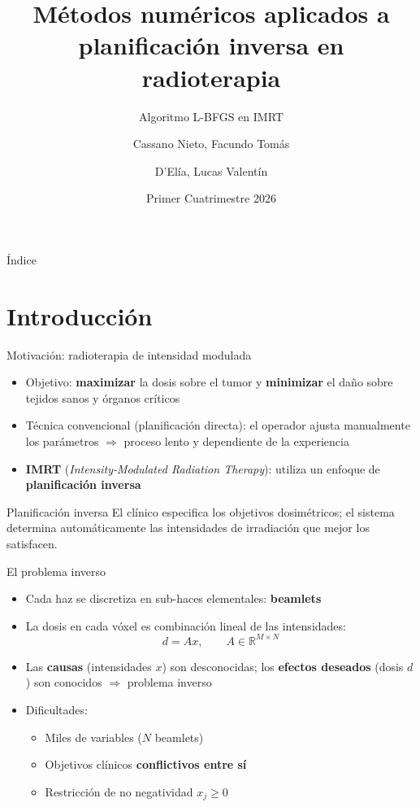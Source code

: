 \documentclass[11pt]{beamer}
\title[L-BFGS en planificación inversa]{Métodos numéricos aplicados a planificación inversa en radioterapia}
\subtitle{Algoritmo L-BFGS en IMRT}
\author[Cassano Nieto \and D'Elía]{Cassano Nieto, Facundo Tomás \and D'Elía, Lucas Valentín}
\institute[ITBA]{Instituto Tecnológico de Buenos Aires \\ 93.54 -- Métodos Numéricos}
\date{Primer Cuatrimestre 2026}
\begin{document}
\begin{frame}
\titlepage
\end{frame}

\begin{frame}{Índice}
\tableofcontents
\end{frame}

\section{Introducción}

\begin{frame}{Motivación: radioterapia de intensidad modulada}
\begin{itemize}
    \item Objetivo: \textbf{maximizar} la dosis sobre el tumor y \textbf{minimizar} el daño sobre tejidos sanos y órganos críticos
    \item Técnica convencional (planificación directa): el operador ajusta manualmente los parámetros $\Rightarrow$ proceso lento y dependiente de la experiencia
    \item \textbf{IMRT} (\textit{Intensity-Modulated Radiation Therapy}): utiliza un enfoque de \textbf{planificación inversa}
\end{itemize}
\begin{block}{Planificación inversa}
    El clínico especifica los objetivos dosimétricos; el sistema determina automáticamente las intensidades de irradiación que mejor los satisfacen.
\end{block}
\end{frame}

\begin{frame}{El problema inverso}
\begin{itemize}
    \item Cada haz se discretiza en sub-haces elementales: \textbf{beamlets}
    \item La dosis en cada vóxel es combinación lineal de las intensidades:
    \[
        d = Ax, \qquad A \in \mathbb{R}^{M \times N}
    \]
    \item Las \textbf{causas} (intensidades $x$) son desconocidas; los \textbf{efectos deseados} (dosis $d$) son conocidos $\Rightarrow$ problema inverso
    \item Dificultades:
    \begin{itemize}
        \item Miles de variables ($N$ beamlets)
        \item Objetivos clínicos \textbf{conflictivos entre sí}
        \item Restricción de no negatividad $x_j \geq 0$
    \end{itemize}
\end{itemize}
\end{frame}
\end{document}
